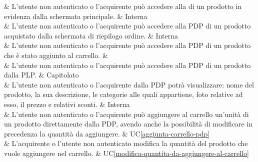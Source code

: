  & L'utente non autenticato o l'acquirente può accedere alla  di un prodotto in evidenza dalla schermata principale. & Interna \\

 & L'utente non autenticato o l'acquirente può accedere alla PDP di un prodotto acquistato dalla schermata di riepilogo ordine. & Interna \\

 & L'utente non autenticato o l'acquirente può accedere alla PDP di un prodotto che è stato aggiunto al carrello. &  \\

 & L'utente non autenticato o l'acquirente può accedere alla PDP di un prodotto dalla PLP. & Capitolato \\

 & L'utente non autenticato o l'acquirente dalla PDP potrà visualizzare: nome del prodotto, la sua descrizione, le categorie alle quali appartiene, foto relative ad esso, il prezzo e relativi sconti. & Interna \\

 & L'utente non autenticato o l'acquirente può aggiungere al carrello un'unità di un prodotto direttamente dalla PDP, avendo anche la possibilità di modificare in precedenza la quantità da aggiungere. & UC\ref{aggiunta-carrello-pdp} \\

 & L'acquirente o l'utente non autenticato modifica la quantità del prodotto che vuole aggiungere nel carrello. & UC\ref{modifica-quantita-da-aggiungere-al-carrello} \\

